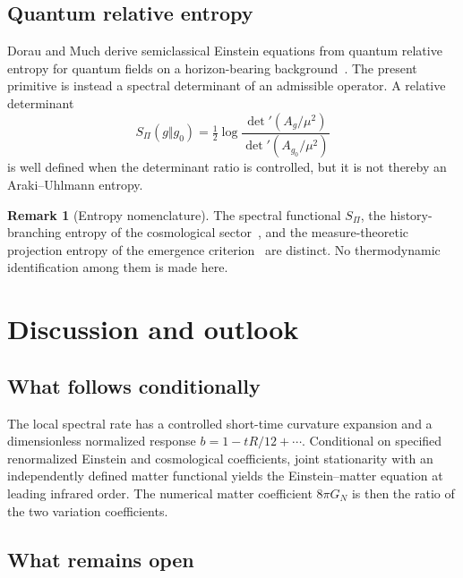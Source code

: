 \documentclass[12pt,a4paper]{article}
\theoremstyle{definition}
\newtheorem{remark}[theorem]{Remark}
\newcommand{\Spi}{S_{\Pi}}
\newcommand{\Ag}{A_g}
\newcommand{\half}{\tfrac{1}{2}}
\begin{document}
    \subsection{Quantum relative entropy}
      \label{subsec:relative-entropy}

      Dorau and Much derive semiclassical Einstein equations from quantum relative entropy for quantum fields on a
      horizon-bearing background~\cite{DorauMuch2026}.
      The present primitive is instead a spectral determinant of an admissible operator.
      A relative determinant
      \begin{equation}
        \Spi(g\Vert g_0)
        =\half\log\frac{\det'(\Ag/\mu^2)}{\det'(A_{g_0}/\mu^2)}
        \label{rmk:relative-spi}
      \end{equation}
      is well defined when the determinant ratio is controlled, but it is not thereby an Araki--Uhlmann entropy.

      \begin{remark}[Entropy nomenclature]
        \label{rmk:entropy-nomenclature}
        The spectral functional $\Spi$, the history-branching entropy of the cosmological sector~\cite{Beau2026d},
        and the measure-theoretic projection entropy of the emergence criterion~\cite{Beau2026l} are distinct.
        No thermodynamic identification among them is made here.
      \end{remark}

  \section{Discussion and outlook}
    \label{sec:discussion}

    \subsection{What follows conditionally}
      \label{subsec:summary}

      The local spectral rate has a controlled short-time curvature expansion and a dimensionless normalized response
      $b=1-tR/12+\cdots$.
      Conditional on specified renormalized Einstein and cosmological coefficients, joint stationarity with an
      independently defined matter functional yields the Einstein--matter equation at leading infrared order.
      The numerical matter coefficient $8\pi G_N$ is then the ratio of the two variation coefficients.

    \subsection{What remains open}
      \label{subsec:limitations}
\end{document}
